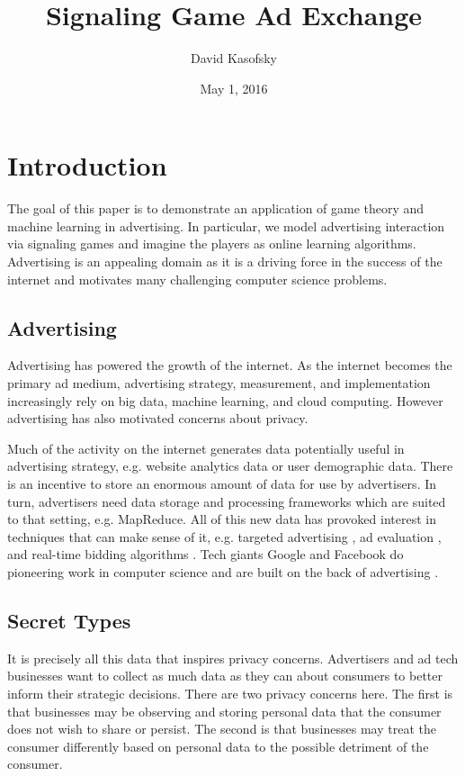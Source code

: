 \documentclass{article}
\title{Signaling Game Ad Exchange}
\author{David Kasofsky}
\date{May 1, 2016}
\begin{document}
\maketitle

\newpage

\tableofcontents

\newpage

\section{Introduction}

The goal of this paper is to demonstrate an application of game theory and machine learning in advertising. In particular, we model advertising interaction via signaling games and imagine the players as online learning algorithms. Advertising is an appealing domain as it is a driving force in the success of the internet and motivates many challenging computer science problems.

\subsection{Advertising}
Advertising has powered the growth of the internet. As the internet becomes the primary ad medium\cite{iab1}, advertising strategy, measurement, and implementation increasingly rely on big data, machine learning, and cloud computing. However advertising has also motivated concerns about privacy.

Much of the activity on the internet generates data potentially useful in advertising strategy, e.g. website analytics data or user demographic data. There is an incentive to store an enormous amount of data for use by advertisers. In turn, advertisers need data storage and processing frameworks which are suited to that setting, e.g. MapReduce\cite{mapreduce1}. All of this new data has provoked interest in techniques that can make sense of it, e.g. targeted advertising \cite{displayadsml1}, ad evaluation \cite{abhishek2012media}, and real-time bidding algorithms \cite{yuan2014survey}. Tech giants Google and Facebook do pioneering work in computer science and are built on the back of advertising \cite{googlerevenue}.

\subsection{Secret Types}

It is precisely all this data that inspires privacy concerns. Advertisers and ad tech businesses want to collect as much data as they can about consumers to better inform their strategic decisions. There are two privacy concerns here. The first is that businesses may be observing and storing personal data that the consumer does not wish to share or persist. The second is that businesses may treat the consumer differently based on personal data to the possible detriment of the consumer.
\end{document}
